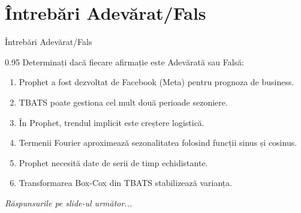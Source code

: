 \documentclass[9pt, aspectratio=169, t]{beamer}
\begin{document}
\section{Întrebări Adevărat/Fals}

\begin{frame}{Întrebări Adevărat/Fals}
    \begin{cminipage}{0.95\textwidth}
    Determinați dacă fiecare afirmație este Adevărată sau Falsă:

    \vspace{0.3cm}
    \begin{enumerate}\setlength{\itemsep}{0pt}
        \item Prophet a fost dezvoltat de Facebook (Meta) pentru prognoza de business.
        \item TBATS poate gestiona cel mult două perioade sezoniere.
        \item În Prophet, trendul implicit este creștere logistică.
        \item Termenii Fourier aproximează sezonalitatea folosind funcții sinus și cosinus.
        \item Prophet necesită date de serii de timp echidistante.
        \item Transformarea Box-Cox din TBATS stabilizează varianța.
    \end{enumerate}

    \vspace{0.3cm}
    \begin{flushright}\textit{Răspunsurile pe slide-ul următor...}\end{flushright}
    \end{cminipage}
\end{frame}
\end{document}
